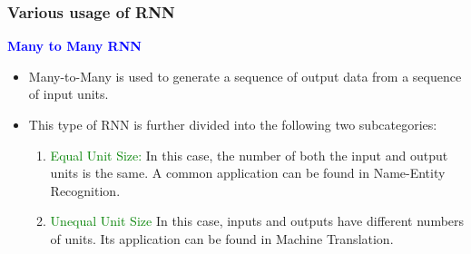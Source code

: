 \documentclass[
	11pt,
]{beamer}
\begin{document}
\begin{frame}
	\frametitle{Various usage of RNN}
	\large{\textcolor{blue}{\textbf{Many to Many RNN}}}
	\begin{itemize}
		\item Many-to-Many is used to generate a sequence of output data from a sequence of input units.
		\item This type of RNN is further divided into the following two subcategories:
		\begin{enumerate}
			\item \textcolor{green}{Equal Unit Size:} In this case, the number of both the input and output units is the same. A common application can be found in Name-Entity Recognition.
			\item \textcolor{green}{Unequal Unit Size} In this case, inputs and outputs have different numbers of units. Its application can be found in Machine Translation.
		\end{enumerate}
	\end{itemize}
	\par
	\hfill
	\par
\end{frame}
\end{document}
